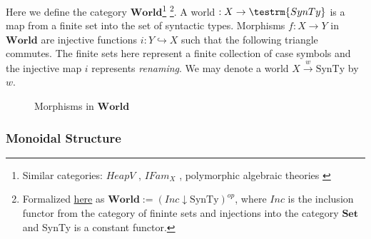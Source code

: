 \documentclass{article}
\newcommand{\world}{{\mathbf{World}}}
\begin{document}
 Here we define the category $\world$\footnote{Similar categories: $HeapV$ \cite{SIMPSON-Independence}, 
 $IFam_X$ \cite{sterlingFreeTheoremsUnivalent}, polymorphic algebraic theories \cite{fioreMultiversalPolymorphicAlgebraic2013}}
 \footnote{Formalized 
 \href{https://github.com/bond15/Bunched-CBPV/blob/68f8b4d006edc9df1d830d7f9cc63822ec77a379/src/Data/Worlds.agda#L33}{here} 
 as $\world := (Inc \downarrow \textrm{SynTy})^{op}$, where $Inc$ is the inclusion functor from the category of fininte sets 
 and injections into the category $\mathbf{Set}$ and SynTy is a constant functor.}. 
 A world $: X \rightarrow \testrm{SynTy}$ is a map from a finite set into the set of syntactic types. Morphisms $f : X \rightarrow Y$ 
 in $\world$ are injective functions $i : Y \hookrightarrow X$ such that the 
 following triangle commutes. The finite sets here represent a finite 
 collection of case symbols and the injective map $i$ represents \textit{renaming}. We may denote a world $X \xrightarrow{w} \textrm{SynTy}$ 
 by $w$.
 

\begin{figure}[!ht]
    \centering
\caption{Morphisms in $\world$}
\end{figure}
 
 
\begin{comment}
Previously, I had maps between worlds as injections where the source map was 
included in the domain map. I've flipped the ordering to make the DCC obviously 
affine(monoidal unit is isomorphic to cartesian unit).    
\end{comment}



  \subsubsection{Monoidal Structure}
\end{document}
